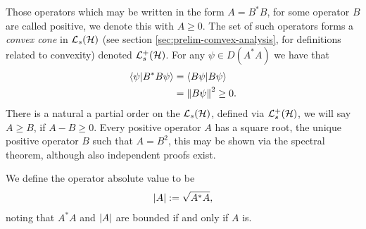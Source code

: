 Those operators which may be written in the form $A = B^*B$, for some operator $B$ are called positive, we denote this with $A\geq 0$. The set of such operators forms a \emph{convex  cone} in $\saops[\hcal]$ (see section \ref{sec:prelim-comvex-analysis}, for definitions related to convexity) denoted $\posops[\hcal]$. For any $\psi\in D(A^*A)$ we have that 
\begin{align}
  \langle\psi | B^* B \psi \rangle &= \langle B \psi | B \psi\rangle \\
                                  &= {\left\lVert{B\psi}\right\rVert}^2 \geq 0.
\end{align}
There is a natural a partial order on the $\saops[\hcal]$, defined via $\posops[\hcal]$, we will say $A\geq B$, if $A-B\geq 0$. Every positive operator $A$ has a square root, the unique positive operator $B$ such that $A = B^2$, this may be shown via the spectral theorem, although also independent proofs exist.


We define the operator absolute value to be
\begin{align}
  {\left\lvert{A}\right\rvert} := \sqrt{A^*A},
\end{align}
noting that $A^*A$ and ${\left\lvert{A}\right\rvert}$ are bounded if and only if $A$ is.

